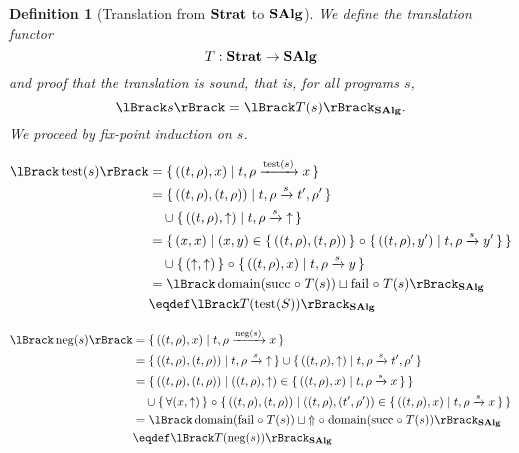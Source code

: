 \documentclass{article}
\newtheorem{definition}[theorem]{Definition}
\begin{document}
\begin{definition}[Translation from $\mathbf{Strat}$ to $\mathbf{SAlg}$] \normalfont
  We define the translation functor \[T : \mathbf{Strat} \rightarrow \mathbf{SAlg}\] and proof that the translation is sound, that is, for all programs $s$, \[ \sem{s} = \semsalg{T(s)}. \] We proceed by fix-point induction on $s$.

\begin{align*}
  \sem{\test{s}}
    &= \setbuild{((t,\rho),x)}{\transformx{t}{\rho}{\test{s}}{x}} \\
     &= \setbuild{((t,\rho),(t,\rho))}{\transform{t}{\rho}{s}{t'}{\rho'}} \\
     &\quad \cup \setbuild{((t,\rho),\fail)}{\transformfail{t}{\rho}{s}} \\
     &= \setbuild{ (x,x) }{ (x,y) \in \setbuildc{((t,\rho),(t,\rho))} \comp \setbuild{((t,\rho),y')}{\transformx{t}{\rho}{s}{y'}}} \\
     &\quad \cup \setbuildc{(\fail,\fail)} \comp \setbuild{((t,\rho),x)}{\transformx{t}{\rho}{s}{y}} \\
     &= \semsalg{\domain(\lsucc \comp T(s)) \sqcup \lfail \comp T(s)} \\
     &\eqdef \semsalg{T(\test{S})}
\end{align*}

\begin{align*}
  \sem{\negate{s}}
    &= \setbuild{((t,\rho),x)}{\transformx{t}{\rho}{\negate{s}}{x}} \\
    &= \setbuild{((t,\rho),(t,\rho))}{\transformfail{t}{\rho}{s}} \cup \setbuild{((t,\rho),\fail)}{\transform{t}{\rho}{s}{t'}{\rho'}} \\
    &= \setbuild{ ((t,\rho),(t,\rho)) }{ ((t,\rho),\fail) \in \setbuild{((t,\rho),x)}{\transformx{t}{\rho}{s}{x}} } \\
    &\quad \cup \setbuildc{\forall (x,\fail)} \comp \setbuild{ ((t,\rho),(t,\rho)) }{ ((t,\rho),(t',\rho')) \in \setbuild{((t,\rho),x)}{\transformx{t}{\rho}{s}{x}}} \\
    &= \semsalg{\domain(\lfail \comp T(s)) \sqcup \Fail \comp \domain(\lsucc \comp T(s))} \\
    &\eqdef \semsalg{T(\negate{s})}
\end{align*}


\end{definition}
\end{document}
